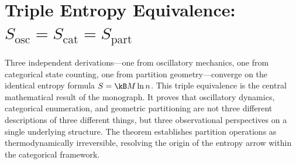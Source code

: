 \chapter{Triple Entropy Equivalence: $S_{\mathrm{osc}} = S_{\mathrm{cat}} = S_{\mathrm{part}}$}
\label{ch:triple_entropy}


\begin{chapterabstract}
Three independent derivations---one from oscillatory mechanics, one from categorical state counting, one from partition geometry---converge on the identical entropy formula $S = \kB M \ln n$. This triple equivalence is the central mathematical result of the monograph. It proves that oscillatory dynamics, categorical enumeration, and geometric partitioning are not three different descriptions of three different things, but three observational perspectives on a single underlying structure. The theorem establishes partition operations as thermodynamically irreversible, resolving the origin of the entropy arrow within the categorical framework.
\end{chapterabstract}







